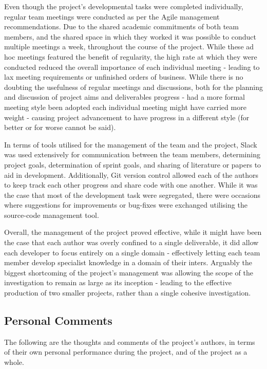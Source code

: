 Even though the project's developmental tasks were completed individually,
regular team meetings were conducted as per the Agile management
recommendations.
Due to the shared academic commitments of both team members, and the shared
space in which they worked it was possible to conduct multiple meetings a
week, throughout the course of the project.
While these ad hoc meetings featured the benefit of regularity, the high rate
at which they were conducted reduced the overall importance of each individual
meeting - leading to lax meeting requirements or unfinished orders of business.
While there is no doubting the usefulness of regular meetings and discussions,
both for the planning and discussion of project aims and deliverables
progress - had a more formal meeting style been adopted each individual meeting
might have carried more weight - causing project advancement to have progress
in a different style (for better or for worse cannot be said).

In terms of tools utilised for the management of the team and the project,
Slack was used extensively for communication between the team members,
determining project goals, determination of sprint goals, and sharing of
literature or papers to aid in development.
Additionally, Git version control allowed each of the authors to keep track
each other progress and share code with one another.
While it was the case that most of the development task were segregated, there
were occasions where suggestions for improvements or bug-fixes were exchanged
utilising the source-code management tool.

Overall, the management of the project proved effective, while it might have
been the case that each author was overly confined to a single deliverable,
it did allow each developer to focus entirely on a single domain - effectively
letting each team member develop specialist knowledge in a domain of their
inters.
Arguably the biggest shortcoming of the project's management was allowing
the scope of the investigation to remain as large as its inception - leading
to the effective production of two smaller projects, rather than a single
cohesive investigation.

\subsection{Personal Comments}
The following are the thoughts and comments of the project's authors,
in terms of their own personal performance during the project, and of the
project as a whole.

